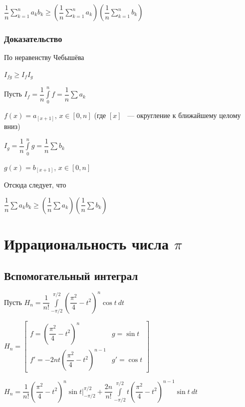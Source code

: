 \documentclass{article}
\begin{document}
                $\dfrac{1}{n} \sum\limits^n_{k = 1} a_k b_k \geq \left( \dfrac{1}{n} \sum\limits^n_{k = 1} a_k \right) \left( \dfrac{1}{n} \sum\limits^n_{k = 1} b_k \right)$
                
            \subsubsection{Доказательство}
            
                По неравенству Чебышёва
                
                $I_{fg} \geq I_f I_g$
                
                Пусть $I_f = \dfrac{1}{n} \int\limits^n_0 f = \dfrac{1}{n} \sum a_k$
                
                $f(x) = a_{[x + 1]}$, $x \in [0, n]$ (где $[x]$ ~--- округление к ближайшему целому вниз)
                
                $I_g = \dfrac{1}{n} \int\limits^n_0 g = \dfrac{1}{n} \sum b_k$
                
                $g(x) = b_{[x + 1]}$, $x \in [0, n]$
                
                Отсюда следует, что
                
                $\dfrac{1}{n} \sum a_k b_k \geq \left( \dfrac{1}{n} \sum a_k \right) \left( \dfrac{1}{n} \sum b_k \right)$
                
	\newpage
	
	\section{Иррациональность числа $\pi$}
	
		\subsection{Вспомогательный интеграл}
		
			Пусть $H_n = \dfrac{1}{n!} \int\limits^{\pi / 2}_{-\pi / 2} \left(\dfrac{\pi^2}{4}-t^2\right)^n \cos{t} \ dt$
			
			$H_n = \begin{bmatrix} f = \left(\dfrac{\pi^2}{4} - t^2\right)^n & g = \sin t \\ f' = -2nt \left(\dfrac{\pi^2}{4} - t^2\right)^{n - 1} & g' = \cos t \end{bmatrix}$
			
			$H_n = \dfrac{1}{n!} \left(\dfrac{\pi^2}{4} - t^2\right)^n \sin t \bigg|^{\pi / 2}_{-\pi / 2} + \dfrac{2n}{n!} \int\limits^{\pi / 2}_{-\pi / 2} t \left( \dfrac{\pi^2}{4}-t^2 \right)^{n - 1} \sin t \ dt$
			
\end{document}
